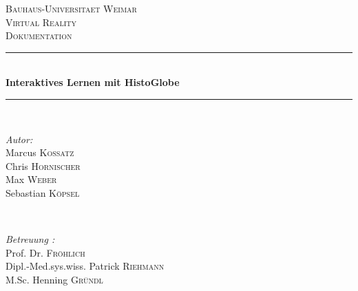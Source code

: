 \begin{titlepage}

\newcommand{\HRule}{\rule{\linewidth}{0.5mm}} 

\center %

\textsc{\Large Bauhaus-Universitaet Weimar}\\[1.5cm] %
\textsc{\Large Virtual Reality }\\[0.5cm] %
\textsc{\large Dokumentation}\\[0.5cm] %

\HRule \\[0.7cm]
{ \huge \bfseries Interaktives Lernen mit HistoGlobe}\\[0.4cm] %
\HRule \\[1.5cm]

\begin{minipage}{0.4\textwidth}
\begin{flushleft} \large
\emph{Autor:}
\\Marcus \textsc{Kossatz}
\\Chris \textsc{Hornischer}
\\Max \textsc{Weber}
\\Sebastian \textsc{Köpsel}
\end{flushleft}
\end{minipage}
~
\begin{minipage}{0.4\textwidth}
\begin{flushright} \large
\emph{Betreuung :} 
\\Prof. Dr. \textsc{Fröhlich} 
\\Dipl.-Med.sys.wiss. Patrick \textsc{Riehmann}
\\M.Sc. Henning \textsc{Gründl}
\end{flushright}
\end{minipage}\\[4cm]

\date{\today} %

\vfill %

\end{titlepage}
